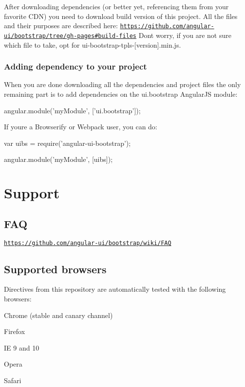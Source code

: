 After downloading dependencies (or better yet, referencing them from your favorite C\+DN) you need to download build version of this project. All the files and their purposes are described here\+: \href{https://github.com/angular-ui/bootstrap/tree/gh-pages#build-files}{\tt https\+://github.\+com/angular-\/ui/bootstrap/tree/gh-\/pages\#build-\/files} Don\textquotesingle{}t worry, if you are not sure which file to take, opt for {\ttfamily ui-\/bootstrap-\/tpls-\/\mbox{[}version\mbox{]}.min.\+js}.

\subsubsection*{Adding dependency to your project}

When you are done downloading all the dependencies and project files the only remaining part is to add dependencies on the {\ttfamily ui.\+bootstrap} Angular\+JS module\+:


\begin{DoxyCode}
angular.module('myModule', ['ui.bootstrap']);
\end{DoxyCode}


If you\textquotesingle{}re a Browserify or Webpack user, you can do\+:


\begin{DoxyCode}
var uibs = require('angular-ui-bootstrap');

angular.module('myModule', [uibs]);
\end{DoxyCode}


\section*{Support}

\subsection*{F\+AQ}

\href{https://github.com/angular-ui/bootstrap/wiki/FAQ}{\tt https\+://github.\+com/angular-\/ui/bootstrap/wiki/\+F\+AQ}

\subsection*{Supported browsers}

Directives from this repository are automatically tested with the following browsers\+:
\begin{DoxyItemize}
\item Chrome (stable and canary channel)
\item Firefox
\item IE 9 and 10
\item Opera
\item Safari
\end{DoxyItemize}

